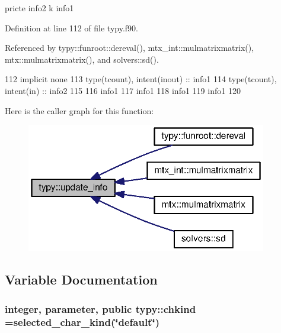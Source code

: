 pricte info2 k info1 



Definition at line 112 of file typy.\+f90.



Referenced by typy\+::funroot\+::dereval(), mtx\+\_\+int\+::mulmatrixmatrix(), mtx\+::mulmatrixmatrix(), and solvers\+::sd().


\begin{DoxyCode}
112         \textcolor{keywordtype}{implicit none}
113         \textcolor{keywordtype}{type}(tcount), \textcolor{keywordtype}{intent(inout)} :: info1
114         \textcolor{keywordtype}{type}(tcount), \textcolor{keywordtype}{intent(in)}    :: info2
115 
116         info1%
117         info1%
118         info1%
119         info1%
120 
\end{DoxyCode}


Here is the caller graph for this function\+:\nopagebreak
\begin{figure}[H]
\begin{center}
\leavevmode
\includegraphics[width=297pt]{namespacetypy_ada3e985608fcf32a049964e60e2428f1_icgraph}
\end{center}
\end{figure}




\subsection{Variable Documentation}
\subsubsection[{chkind}]{\setlength{\rightskip}{0pt plus 5cm}integer, parameter, public typy\+::chkind =selected\+\_\+char\+\_\+kind(\char`\"{}default\char`\"{})}\label{namespacetypy_afe2d7be9b03aa584baf1034c60e0e648}


